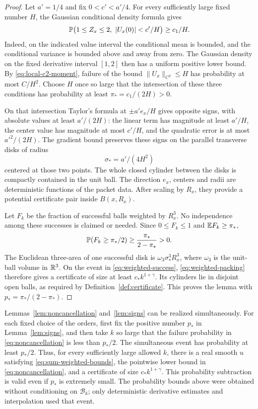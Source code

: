 \begin{proof}
Let $a'=1/4$ and fix $0<c'<a'/4$. For every sufficiently large
fixed number $H$, the Gaussian conditional density formula gives
\[
 \mathbb P\bigl(1\le Z_x\le2,\ |U_x(0)|<c'/H\bigr)\ge c_1/H.
\]
Indeed, on the indicated value interval the conditional mean is
bounded, and the conditional variance is bounded above and away
from zero. The Gaussian density on the fixed derivative interval
$[1,2]$ then has a uniform positive lower bound. By
\eqref{eq:local-c2-moment}, failure of the bound
$\lVert U_x\rVert_{C^2}\le H$ has probability at most $C/H^2$.
Choose $H$ once so large that the intersection of these three
conditions has probability at least
$\pi_*=c_1/(2H)>0$.

On that intersection Taylor's formula at $\pm a'e_x/H$ gives
opposite signs, with absolute values at least $a'/(2H)$:
the linear term has magnitude at least $a'/H$, the center value
has magnitude at most $c'/H$, and the quadratic error is at most
$a'^2/(2H)$. The gradient bound preserves these signs on the
parallel transverse disks of radius
\[
 \sigma_* = a'/(4H^2)
\]
centered at those two points. The whole closed cylinder between
the disks is compactly contained in the unit ball. The direction
$e_x$, centers and radii are deterministic functions of the packet
data. After scaling by $R_x$, they provide a potential certificate
pair inside $B(x,R_x)$.

Let $F_k$ be the fraction of successful balls weighted by $R_x^3$.
No independence among these successes is claimed or needed.
Since $0\le F_k\le1$ and $\mathbb E F_k\ge\pi_*$,
\begin{equation}\label{eq:weighted-success}
 \mathbb P(F_k\ge\pi_*/2)\ge\frac{\pi_*}{2-\pi_*}>0.
\end{equation}
The Euclidean three-area of one successful disk is
$\omega_3\sigma_*^3R_x^3$, where $\omega_3$ is the unit-ball
volume in $\mathbb R^3$. On the event in \eqref{eq:weighted-success},
\eqref{eq:weighted-packing} therefore gives a certificate of size
at least $c_*k^{1+\gamma}$. Its cylinders lie in disjoint open
balls, as required by Definition~\ref{def:certificate}. This proves
the lemma with $p_* =\pi_* /(2-\pi_*)$.
\end{proof}

Lemmas~\ref{lem:noncancellation} and~\ref{lem:signs} can be realized
simultaneously. For each fixed choice of the orders, first fix the
positive number $p_*$ in Lemma~\ref{lem:signs}, and then take $k$
so large that the failure probability in
\eqref{eq:noncancellation} is less than $p_*/2$. The simultaneous
event has probability at least $p_*/2$. Thus, for every sufficiently
large allowed $k$, there is a real smooth $u$ satisfying
\eqref{eq:sum-weighted-bounds}, the pointwise lower bound in
\eqref{eq:noncancellation}, and a certificate of size
$c_*k^{1+\gamma}$. This probability subtraction is valid even if
$p_*$ is extremely small. The probability bounds above were obtained
without conditioning on $\mathcal B_k$; only deterministic derivative
estimates and interpolation used that event.

